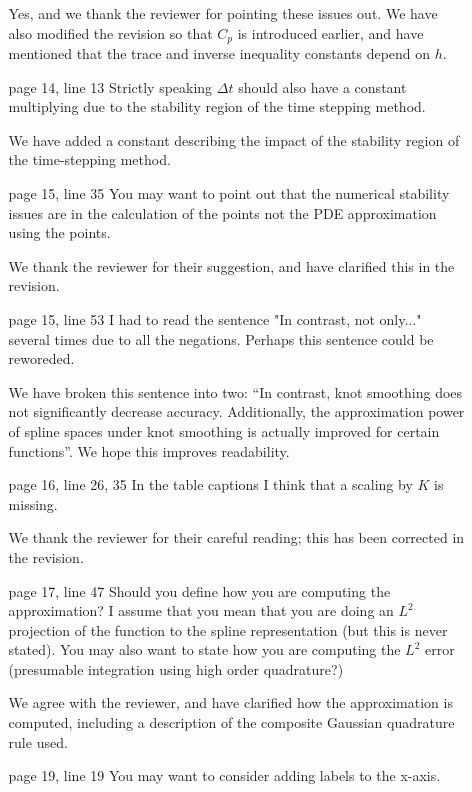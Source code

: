 \documentclass[10pt]{article}
\newcommand{\note}[1]{{\color{violet}#1}}
\begin{document}
\begin{enumerate}
\begin{enumerate}
\note{Yes, and we thank the reviewer for pointing these issues out.  We have also modified the revision so that $C_p$ is introduced earlier, and have mentioned that the trace and inverse inequality constants depend on $h$.}

\item [page 14, line 13] Strictly speaking $\Delta t$ should also have a constant multiplying due to the stability region of the time stepping method.

\note{We have added a constant describing the impact of the stability region of the time-stepping method.}

\item [page 15, line 35] You may want to point out that the numerical stability issues are in the calculation of the points not the PDE approximation using the points.

\note{We thank the reviewer for their suggestion, and have clarified this in the revision.}

\item [page 15, line 53] I had to read the sentence "In contrast, not only..." several times due to all the negations. Perhaps this sentence could be reworeded.

\note{We have broken this sentence into two: ``In contrast, knot smoothing does not significantly decrease accuracy.  Additionally, the approximation power of spline spaces under knot smoothing is actually improved for certain functions''.  We hope this improves readability.}

\item [page 16, line 26, 35] In the table captions I think that a scaling by $K$ is missing.

\note{We thank the reviewer for their careful reading; this has been corrected in the revision.}

\item [page 17, line 47] Should you define how you are computing the approximation? I assume that you mean that you are doing an $L^2$ projection of the function to the spline representation (but this is never stated). You may also want to state how you are computing the $L^2$ error (presumable integration using high order quadrature?)

\note{We agree with the reviewer, and have clarified how the approximation is computed, including a description of the composite Gaussian quadrature rule used.}

\item [page 19, line 19] You may want to consider adding labels to the x-axis.


\end{enumerate}
\end{enumerate}
\end{document}
